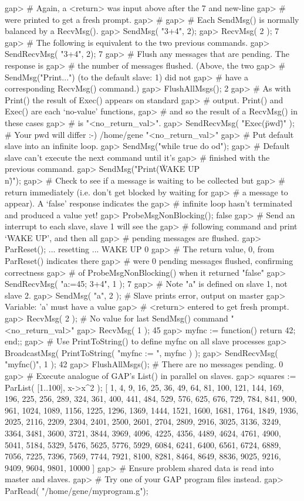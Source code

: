 gap> # Again, a <return> was input above after the 7 and new-line
gap> # were printed to get a fresh prompt.
gap> #
gap> # Each SendMsg() is normally balanced by a RecvMsg().
gap> SendMsg( "3+4", 2);
gap> RecvMsg( 2 );
7
gap> # The following is equivalent to the two previous commands.
gap> SendRecvMsg( "3+4", 2);
7
gap> # Flush any messages that are pending. The response is
gap> # the number of messages flushed. (Above, the two
gap> # SendMsg("Print...") (to the default slave: 1) did not
gap> # have a corresponding RecvMsg() command.)
gap> FlushAllMsgs();
2
gap> # As with Print() the result of Exec() appears on standard
gap> # output. Print() and Exec() are each `no-value' functions,
gap> # and so the result of a RecvMsg() in these cases
gap> # is "<no_return_val>".
gap> SendRecvMsg( "Exec(\"pwd\")" ); # Your pwd will differ :-)
/home/gene
"<no_return_val>"
gap> # Put default slave into an infinite loop.
gap> SendMsg("while true do od");
gap> # Default slave can't execute the next command until it's 
gap> # finished with the previous command.
gap> SendMsg("Print(\"WAKE UP\\n\")");
gap> # Check to see if a message is waiting to be collected but
gap> # return immediately (i.e. don't get blocked by waiting for
gap> # a message to appear). A `false' response indicates the
gap> # infinite loop hasn't terminated and produced a value yet!
gap> ProbeMsgNonBlocking();
false
gap> # Send an interrupt to each slave, slave 1 will see the
gap> # following command and print `WAKE UP', and then all
gap> # pending messages are flushed.
gap> ParReset();
... resetting ...
WAKE UP
0
gap> # The return value, 0, from ParReset() indicates there
gap> # were 0 pending messages flushed, confirming correctness
gap> # of ProbeMsgNonBlocking() when it returned "false"
gap> SendRecvMsg( "a:=45; 3+4", 1 );
7
gap> # Note "a" is defined on slave 1, not slave 2.
gap> SendMsg( "a", 2 ); # Slave prints error, output on master
gap>  Variable: 'a' must have a value
gap> # <return> entered to get fresh prompt.
gap> RecvMsg( 2 ); # No value for last SendMsg() command
"<no_return_val>"
gap> RecvMsg( 1 );
45
gap> myfnc := function() return 42; end;;
gap> # Use PrintToString() to define myfnc on all slave processes
gap> BroadcastMsg( PrintToString( "myfnc := ", myfnc ) );
gap> SendRecvMsg( "myfnc()", 1 );
42
gap> FlushAllMsgs(); # There are no messages pending.
0
gap> # Execute analogue of GAP's List() in parallel on slaves.
gap> squares := ParList( [1..100], x->x^2 );
[ 1, 4, 9, 16, 25, 36, 49, 64, 81, 100, 121, 144, 169, 196, 225, 256, 
  289, 324, 361, 400, 441, 484, 529, 576, 625, 676, 729, 784, 841, 
  900, 961, 1024, 1089, 1156, 1225, 1296, 1369, 1444, 1521, 1600, 
  1681, 1764, 1849, 1936, 2025, 2116, 2209, 2304, 2401, 2500, 2601, 
  2704, 2809, 2916, 3025, 3136, 3249, 3364, 3481, 3600, 3721, 3844, 
  3969, 4096, 4225, 4356, 4489, 4624, 4761, 4900, 5041, 5184, 5329, 
  5476, 5625, 5776, 5929, 6084, 6241, 6400, 6561, 6724, 6889, 7056, 
  7225, 7396, 7569, 7744, 7921, 8100, 8281, 8464, 8649, 8836, 9025, 
  9216, 9409, 9604, 9801, 10000 ]
gap> # Ensure problem shared data is read into master and slaves.
gap> # Try one of your GAP program files instead.
gap> ParRead( "/home/gene/myprogram.g");
\endexample

